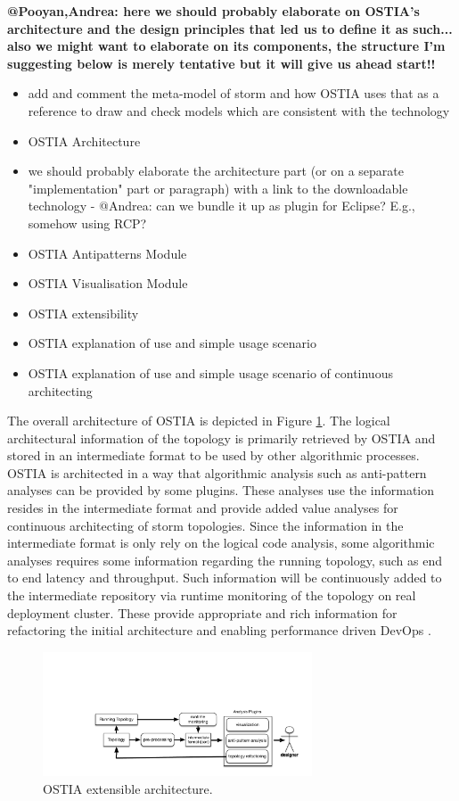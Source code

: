 \textbf{@Pooyan,Andrea: here we should probably elaborate on OSTIA's architecture and the design principles that led us to define it as such... also we might want to elaborate on its components, the structure I'm suggesting below is merely tentative but it will give us ahead start!!}

\begin{itemize}
\item add and comment the meta-model of storm and how OSTIA uses that as a reference to draw and check models which are consistent with the technology
\item OSTIA Architecture 
\item we should probably elaborate the architecture part (or on a separate "implementation" part or paragraph) with a link to the downloadable technology - @Andrea: can we bundle it up as plugin for Eclipse? E.g., somehow using RCP?
\item OSTIA Antipatterns Module
\item OSTIA Visualisation Module 
\item OSTIA extensibility
\item OSTIA explanation of use and simple usage scenario
\item OSTIA explanation of use and simple usage scenario of continuous architecting
\end{itemize}


The overall architecture of OSTIA is depicted in Figure \ref{fig:ostia-arch}. The logical architectural information of the topology is primarily retrieved by OSTIA and stored in an intermediate format to be used by other algorithmic processes. OSTIA is architected in a way that algorithmic analysis such as anti-pattern analyses can be provided by some plugins. These analyses use the information resides in the intermediate format and provide added value analyses for continuous architecting of storm topologies. Since the information in the intermediate format is only rely on the logical code analysis, some algorithmic analyses requires some information regarding the running topology, such as end to end latency and throughput. Such information will be continuously added to the intermediate repository via runtime monitoring of the topology on real deployment cluster. These provide appropriate and rich information for refactoring the initial architecture and enabling performance driven DevOps \cite{brunnert2015performance}.

\begin{figure}[H]
	\begin{center}
		\includegraphics[width=8cm]{images/ostia-arch}
		\caption{OSTIA extensible architecture.}
		\label{fig:ostia-arch}
	\end{center}
\end{figure}


